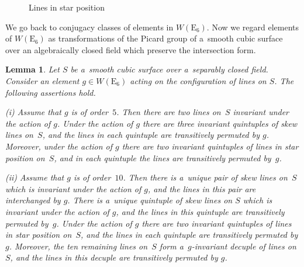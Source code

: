\documentclass{amsart}
\numberwithin{equation}{section}
\theoremstyle{plain}
\newtheorem{lemma}{Lemma}
\theoremstyle{definition}
\theoremstyle{remark}
\begin{document}
\begin{figure}[H]
\begin{center}

\end{center}
\caption{Lines in star position}
\label{fig1}
\end{figure}


We go back to conjugacy classes of elements in $W(\mathrm{E}_6)$. Now we regard elements
of $W(\mathrm{E}_6)$ as transformations of the Picard group of a~smooth cubic surface over an algebraically closed field which preserve the intersection form.

\begin{lemma}
\label{l12}
Let $S$ be a~smooth cubic surface over a~separably closed field. Consider an element $g \in W(\mathrm{E}_6)$ acting on the configuration of lines on $S$. The following assertions hold.

{\rm (i)} Assume that $g$ is of order~$5$. Then there are two lines on~$S$ invariant under the action of $g$. Under the action of $g$ there are three invariant quintuples of skew lines on~$S$, and the lines in each quintuple are transitively permuted by $g$. Moreover, under the action of $g$ there are two invariant quintuples of lines in star position on~$S$, and in each quintuple the lines are transitively permuted by~$g$.

{\rm (ii)} Assume that $g$ is of order~$10$. Then there is a~unique pair of skew lines on~$S$ which is invariant under the action of $g$, and the lines in this pair are interchanged by $g$. There is a~unique quintuple of skew lines on $S$ which is invariant under the action of $g$, and the lines in this quintuple are transitively permuted by~$g$. Under the action of $g$ there are two invariant quintuples of lines in star position on~$S$, and the lines in each quintuple are transitively permuted by $g$. Moreover, the ten remaining lines on~$S$ form a~$g$-invariant decuple of lines on $S$, and the lines in this decuple are transitively permuted by $g$.
\end{lemma}
\end{document}
